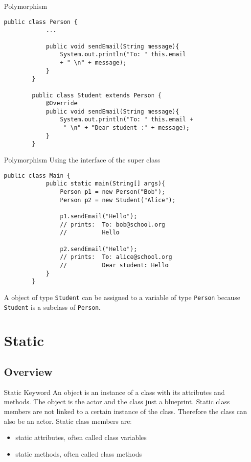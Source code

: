 \begin{frame}[fragile]{Polymorphism}
	\begin{lstlisting}[escapechar=!]
		public class Person {	
			...
			
			public void sendEmail(String message){
				System.out.println("To: " this.email 
				+ " \n" + message);
			}
		}
		
		public class Student extends Person {
			@Override
			public void sendEmail(String message){
				System.out.println("To: " this.email +
				 " \n" + "Dear student :" + message);
			}	
		}
	\end{lstlisting}
	
\end{frame}

\begin{frame}[fragile]{Polymorphism}
	Using the interface of the super class
	\begin{lstlisting}[escapechar=!]
		public class Main {
			public static main(String[] args){
				Person p1 = new Person("Bob");
				Person p2 = new Student("Alice");
				
				p1.sendEmail("Hello");
				// prints: 	To: bob@school.org
				//			Hello
				
				p2.sendEmail("Hello");
				// prints: 	To: alice@school.org
				//			Dear student: Hello	
			}	
		}
	\end{lstlisting}
	A object of type \texttt{Student} can be assigned to a variable of type \texttt{Person} because \texttt{Student} is a subclass of \texttt{Person}.
	\end{frame}


\section{Static}

\subsection{Overview}
\begin{frame}{Static Keyword}
	An object is an instance of a class with its attributes and methods.
	The object is the actor and the class just a blueprint.
	\vfill
	Static class members are not linked to a certain instance of the class.
	Therefore the class can also be an actor.
	\vfill
	Static class members are:
	\begin{itemize}
		\item static attributes, often called class variables
		\item static methods, often called class methods
	\end{itemize}
\end{frame}

